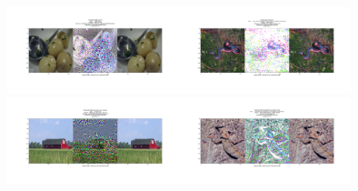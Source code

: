 \begin{frame}
 \begin{figure}[H]
\label{lbfgsis}
\includegraphics[trim=200 185 100 200, clip, width=5cm]{2019-04-10-adverse/imnet_examples/vgg16-ILSVRC2012_val_00039098-O722-A965-attack_summary.png}\includegraphics[trim=200 185 100 200, clip, width=5cm]{2019-04-10-adverse/imnet_examples/vgg16-ILSVRC2012_val_00027142-O52-A347-attack_summary.png}
\includegraphics[trim=200 185 100 200, clip, width=5cm]{2019-04-10-adverse/imnet_examples/vgg16-ILSVRC2012_val_00029901-O425-A468-attack_summary.png}\includegraphics[trim=200 185 100 200, clip, width=5cm]{2019-04-10-adverse/imnet_examples/ILSVRC2012_val_00001375-Otensor([42])-A694-attack_summary.png}
\end{figure}   

\end{frame}
